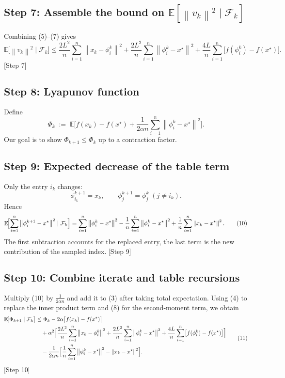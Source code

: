 \documentclass{article}
\newcommand{\E}{\mathbb{E}}
\newcommand{\norm}[1]{\left\|#1\right\|}
\begin{document}
\subsection*{Step 7: Assemble the bound on $\E[\norm{v_k}^{2}\mid\mathcal{F}_k]$}
Combining (5)–(7) gives
\[
\E\!\bigl[\norm{v_k}^{2}\mid\mathcal{F}_k\bigr]
 \le \frac{2L^{2}}{n}\sum_{i=1}^{n}\norm{x_k-\phi_i^k}^{2}
   +\frac{2L^{2}}{n}\sum_{i=1}^{n}\norm{\phi_i^k-x^\star}^{2}
   +\frac{4L}{n}\sum_{i=1}^{n}\bigl[f(\phi_i^k)-f(x^\star)\bigr]. \tag{8}
\]
[Step 7]

\subsection*{Step 8: Lyapunov function}
Define
\[
\Phi_k \;:=\; \E\!\bigl[ f(x_k)-f(x^\star)
    +\frac{1}{2\alpha n}\sum_{i=1}^{n}\norm{\phi_i^k-x^\star}^{2}\bigr]. \tag{9}
\]
Our goal is to show $\Phi_{k+1}\le\Phi_k$ up to a contraction factor.

\subsection*{Step 9: Expected decrease of the table term}
Only the entry $i_k$ changes:
\[
\phi_{i_k}^{k+1}=x_k,\qquad
\phi_j^{k+1}=\phi_j^{k}\;(j\neq i_k).
\]
Hence
\[
\E\!\Bigl[\sum_{i=1}^{n}\norm{\phi_i^{k+1}-x^\star}^{2}\mid\mathcal{F}_k\Bigr]
 = \sum_{i=1}^{n}\norm{\phi_i^{k}-x^\star}^{2}
   -\frac1n\sum_{i=1}^{n}\norm{\phi_i^{k}-x^\star}^{2}
   +\frac1n\sum_{i=1}^{n}\norm{x_k-x^\star}^{2}. \tag{10}
\]
The first subtraction accounts for the replaced entry, the last term is the
new contribution of the sampled index.
[Step 9]

\subsection*{Step 10: Combine iterate and table recursions}
Multiply (10) by $\frac{1}{2\alpha n}$ and add it to (3) after taking total
expectation. Using (4) to replace the inner product term and (8) for the
second‑moment term, we obtain
\[
\begin{aligned}
\E\!\bigl[\Phi_{k+1}\mid\mathcal{F}_k\bigr]
 &\le \Phi_k
   -2\alpha\bigl[f(x_k)-f(x^\star)\bigr]      \\
 &\quad +\alpha^{2}\Bigl[
        \frac{2L^{2}}{n}\sum_{i=1}^{n}\norm{x_k-\phi_i^k}^{2}
       +\frac{2L^{2}}{n}\sum_{i=1}^{n}\norm{\phi_i^k-x^\star}^{2}
       +\frac{4L}{n}\sum_{i=1}^{n}\bigl[f(\phi_i^k)-f(x^\star)\bigr]
      \Bigr] \\
 &\quad -\frac{1}{2\alpha n}\Bigl[
        \frac1n\sum_{i=1}^{n}\norm{\phi_i^{k}-x^\star}^{2}
        -\norm{x_k-x^\star}^{2}
      \Bigr].
\end{aligned} \tag{11}
\]
[Step 10]
\end{document}
